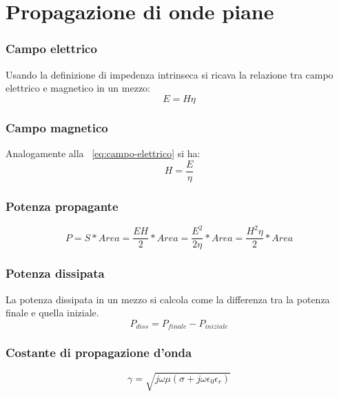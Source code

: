 
\chapter{Propagazione di onde piane}

	\subsection{Campo elettrico}
	Usando la definizione di impedenza intrinseca si ricava la relazione tra campo elettrico e magnetico in un mezzo:
		\begin{equation}
		E=H\eta
		\label{eq:campo-elettrico}
		\end{equation}
		

	\subsection{Campo magnetico}
	Analogamente alla ~\ref{eq:campo-elettrico} si ha: 
		\begin{equation}
		H=\frac{E}{\eta}
		\label{eq:campo-magnetico}
		\end{equation}
	

	\subsection{Potenza propagante}


		\begin{equation}
		P=S*Area=\frac{EH}{2}*Area=\frac{E^2}{2\eta}*Area=\frac{H^2\eta}{2}*Area
		\label{eq:potenza-propagante}
		\end{equation}
	
	\subsection{Potenza dissipata}

		La potenza dissipata in un mezzo si calcola come la differenza tra la potenza finale e quella iniziale.
		\begin{equation}
			P_{diss}=P_{finale}-P_{iniziale}
			\label{eq:potenza-dissipata}
		\end{equation}
	
	\subsection{Costante di propagazione d'onda}
		\begin{equation}
		\gamma=\sqrt{j\omega\mu(\sigma+j\omega\epsilon_0\epsilon_r)}
		\end{equation}
